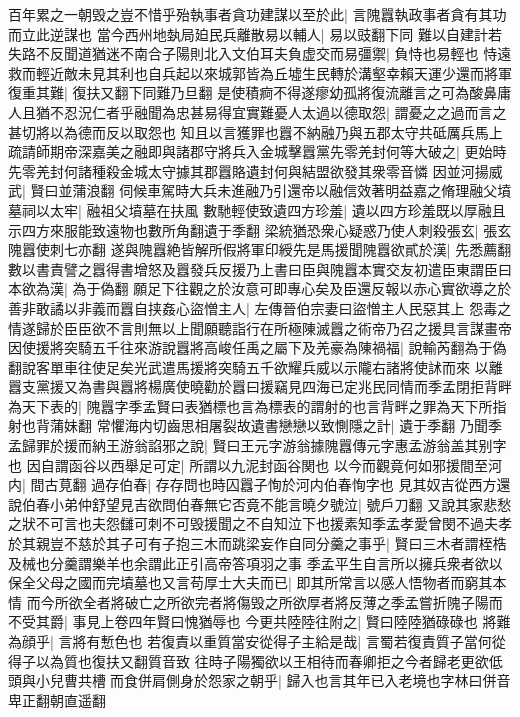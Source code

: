 百年累之一朝毁之豈不惜乎殆執事者貪功建謀以至於此|{
	言隗囂執政事者貪有其功而立此逆謀也}
當今西州地埶局廹民兵離散易以輔人|{
	易以豉翻下同}
難以自建計若失路不反聞道猶迷不南合子陽則北入文伯耳夫負虚交而易彊禦|{
	負恃也易輕也}
恃遠救而輕近敵未見其利也自兵起以來城郭皆為丘墟生民轉於溝壑幸賴天運少還而將軍復重其難|{
	復扶又翻下同難乃旦翻}
是使積痾不得遂瘳幼孤將復流離言之可為酸鼻庸人且猶不忍況仁者乎融聞為忠甚易得宜實難憂人太過以德取怨|{
	謂憂之之過而言之甚切將以為德而反以取怨也}
知且以言獲罪也囂不納融乃與五郡太守共砥厲兵馬上疏請師期帝深嘉美之融即與諸郡守將兵入金城擊囂黨先零羌封何等大破之|{
	更始時先零羌封何諸種殺金城太守據其郡囂賂遺封何與結盟欲發其衆零音憐}
因並河揚威武|{
	賢曰並蒲浪翻}
伺候車駕時大兵未進融乃引還帝以融信效著明益嘉之脩理融父墳墓祠以太牢|{
	融祖父墳墓在扶風}
數馳輕使致遺四方珍羞|{
	遺以四方珍羞既以厚融且示四方來服能致遠物也數所角翻遺于季翻}
梁統猶恐衆心疑惑乃使人刺殺張玄|{
	張玄隗囂使刺七亦翻}
遂與隗囂絶皆解所假將軍印綬先是馬援聞隗囂欲貳於漢|{
	先悉薦翻}
數以書責譬之囂得書增怒及囂發兵反援乃上書曰臣與隗囂本實交友初遣臣東謂臣曰本欲為漢|{
	為于偽翻}
願足下往觀之於汝意可即專心矣及臣還反報以赤心實欲導之於善非敢譎以非義而囂自挟姦心盜憎主人|{
	左傳晉伯宗妻曰盜憎主人民惡其上}
怨毒之情遂歸於臣臣欲不言則無以上聞願聽詣行在所極陳滅囂之術帝乃召之援具言謀畫帝因使援將突騎五千往來游說囂將高峻任禹之屬下及羌豪為陳禍福|{
	說輸芮翻為于偽翻說客單車往使足矣光武遣馬援將突騎五千欲耀兵威以示隴右諸將使訹而來}
以離囂支黨援又為書與囂將楊廣使曉勸於囂曰援竊見四海已定兆民同情而季孟閉拒背畔為天下表的|{
	隗囂字季孟賢曰表猶標也言為標表的謂射的也言背畔之罪為天下所指射也背蒲妹翻}
常懼海内切齒思相屠裂故遺書戀戀以致惻隱之計|{
	遺于季翻}
乃聞季孟歸罪於援而納王游翁諂邪之說|{
	賢曰王元字游翁據隗囂傳元字惠孟游翁盖其别字也}
因自謂函谷以西舉足可定|{
	所謂以九泥封函谷関也}
以今而觀竟何如邪援間至河内|{
	間古莧翻}
過存伯春|{
	存存問也時囚囂子恂於河内伯春恂字也}
見其奴吉從西方還說伯春小弟仲舒望見吉欲問伯春無它否竟不能言曉夕號泣|{
	號戶刀翻}
又說其家悲愁之狀不可言也夫怨讎可刺不可毁援聞之不自知泣下也援素知季孟孝愛曾閔不過夫孝於其親豈不慈於其子可有子抱三木而跳梁妄作自同分羹之事乎|{
	賢曰三木者謂桎梏及械也分羹謂樂羊也余謂此正引高帝答項羽之事}
季孟平生自言所以擁兵衆者欲以保全父母之國而完墳墓也又言苟厚士大夫而已|{
	即其所常言以感人悟物者而窮其本情}
而今所欲全者將破亡之所欲完者將傷毁之所欲厚者將反薄之季孟嘗折隗子陽而不受其爵|{
	事見上卷四年賢曰愧猶辱也}
今更共陸陸往附之|{
	賢曰陸陸猶碌碌也}
將難為顔乎|{
	言將有慙色也}
若復責以重質當安從得子主給是哉|{
	言蜀若復責質子當何從得子以為質也復扶又翻質音致}
往時子陽獨欲以王相待而春卿拒之今者歸老更欲低頭與小兒曹共槽而食併肩側身於怨家之朝乎|{
	歸入也言其年已入老境也字林曰併音卑正翻朝直遥翻}
